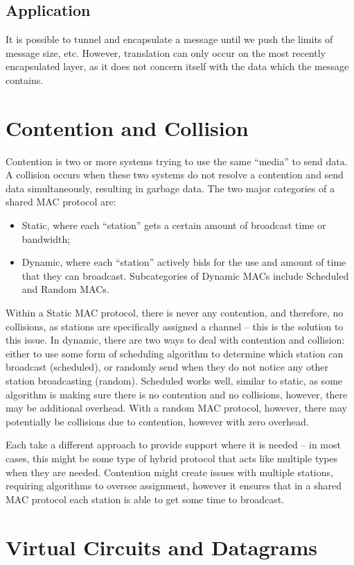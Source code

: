 \documentclass{article}
\begin{document}
\subsection{Application}
It is possible to tunnel and encapsulate a message until we push the limits of message size, etc. However, translation can only occur on the most recently encapsulated layer, as it does not concern itself with the data which the message contains. 

\section{Contention and Collision}
Contention is two or more systems trying to use the same ``media'' to send
data. A collision occurs when these two systems do not resolve a contention and
send data simultaneously, resulting in garbage data. The two major categories of a shared MAC protocol are:
\begin{itemize}
    \item Static, where each ``station'' gets a certain amount of broadcast
    time or bandwidth;
    \item Dynamic, where each ``station'' actively bids for the use and amount
    of time that they can broadcast. Subcategories of Dynamic MACs include
    Scheduled and Random MACs.
\end{itemize}
Within a Static MAC protocol, there is never any contention, and therefore, no
collisions, as stations are specifically assigned a channel -- this is the
solution to this issue. In dynamic, there are two ways to deal with contention
and collision: either to use some form of scheduling algorithm to determine
which station can broadcast (scheduled), or randomly send when they do not
notice any other station broadcasting (random). Scheduled works well, similar
to static, as some algorithm is making sure there is no contention and no
collisions, however, there may be additional overhead. With a random MAC
protocol, however, there may potentially be collisions due to contention,
however with zero overhead. 

Each take a different approach to provide support where it is needed -- in most
cases, this might be some type of hybrid protocol that acts like multiple types
when they are needed. Contention might create issues with multiple stations,
requiring algorithms to oversee assignment, however it ensures that in a shared
MAC protocol each station is able to get some time to broadcast.

\section{Virtual Circuits and Datagrams}
\end{document}
